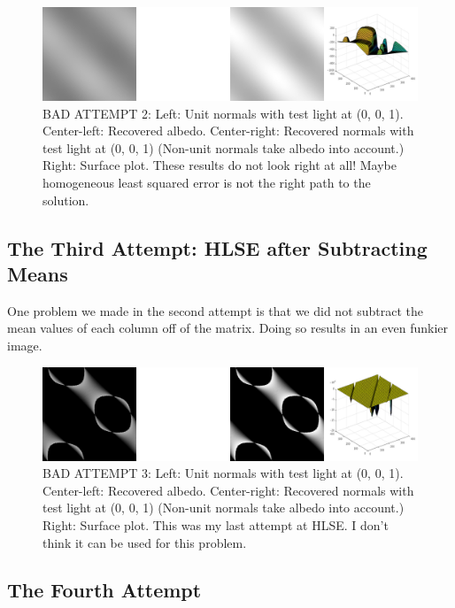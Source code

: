 \documentclass{article}
\begin{document}
\begin{figure}[!ht]
	\centering
	\includegraphics[width=160mm]{figs/q2_im2_bad2_all_figs.png}
	\caption{BAD ATTEMPT 2: Left: Unit normals with test light at (0, 0, 1). Center-left: 
        Recovered albedo. Center-right: Recovered normals with test light at (0, 
        0, 1) (Non-unit normals take albedo into account.) Right: Surface plot. 
        These results do not look right at all! Maybe homogeneous least squared 
        error is not the right path to the solution.}
\end{figure}

\subsection{The Third Attempt: HLSE after Subtracting Means}

One problem we made in the second attempt is that we did not subtract the mean 
values of each column off of the matrix. Doing so results in an even funkier 
image.

\begin{figure}[!ht]
	\centering
	\includegraphics[width=160mm]{figs/q2_im2_bad3_all_figs.png}
	\caption{BAD ATTEMPT 3: Left: Unit normals with test light at (0, 0, 1). Center-left: 
        Recovered albedo. Center-right: Recovered normals with test light at (0, 
        0, 1) (Non-unit normals take albedo into account.) Right: Surface plot. 
        This was my last attempt at HLSE. I don't think it can be used for this 
        problem.}
\end{figure}

\subsection{The Fourth Attempt}
\end{document}
